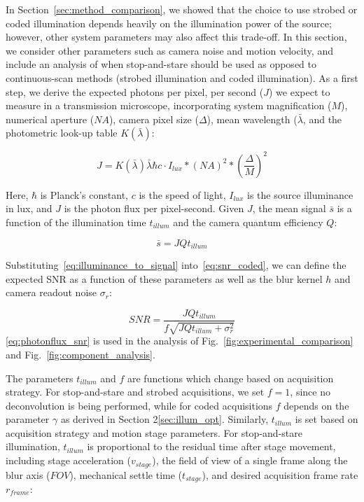 In Section~\ref{sec:method_comparison}, we showed that the choice to use strobed or coded illumination depends heavily on the illumination power of the source; however, other system parameters may also affect this trade-off. In this section, we consider other parameters such as camera noise and motion velocity, and include an analysis of when stop-and-stare should be used as opposed to continuous-scan methods (strobed illumination and coded illumination). As a first step, we derive the expected photons per pixel, per second ($J$) we expect to measure in a transmission microscope, incorporating system magnification ($M$), numerical aperture ($NA$), camera pixel size ($\Delta$), mean wavelength ($\bar{\lambda}$, and the photometric look-up table $K(\bar{\lambda})$:

\begin{equation}
\label{eq:photonflux}
J = K(\bar{\lambda}) \bar{\lambda}\hbar c \cdot I_{lux} * (NA)^2 * (\frac{\Delta}{M})^2
\end{equation}

Here, $\hbar$ is Planck's constant, $c$ is the speed of light, $I_{lux}$ is the source illuminance in lux, and $J$ is the photon flux per pixel-second. Given $J$, the mean signal $\bar{s}$ is a function of the illumination time $t_{illum}$ and the camera quantum efficiency $Q$:

\begin{equation}
\label{eq:illuminance_to_signal}
    \bar{s} = J Q t_{illum}
\end{equation}

Substituting~\eqref{eq:illuminance_to_signal} into~\eqref{eq:snr_coded}, we can define the expected SNR as a function of these parameters as well as the blur kernel $h$ and camera readout noise $\sigma_r$:

\begin{equation}
\label{eq:photonflux_snr}
SNR = \frac{J Q t_{illum}}{f \sqrt{J Q t_{illum} + \sigma_r^2}}
\end{equation}
\eqref{eq:photonflux_snr} is used in the analysis of Fig.~\ref{fig:experimental_comparison} and Fig.~\ref{fig:component_analysis}.

The parameters $t_{illum}$ and $f$ are functions which change based on acquisition strategy. 
For stop-and-stare and strobed acquisitions, we set $f = 1$, since no deconvolution is being performed, while for coded acquisitions $f$ depends on the parameter $\gamma$ as derived in Section 2\ref{sec:illum_opt}. 
Similarly, $t_{illum}$ is set based on acquisition strategy and motion stage parameters. For stop-and-stare illumination, $t_{illum}$ is proportional to the residual time after stage movement, including stage acceleration ($v_{stage}$), the field of view of a single frame along the blur axis ($FOV$), mechanical settle time ($t_{stage}$), and desired acquisition frame rate $r_{frame}$:

